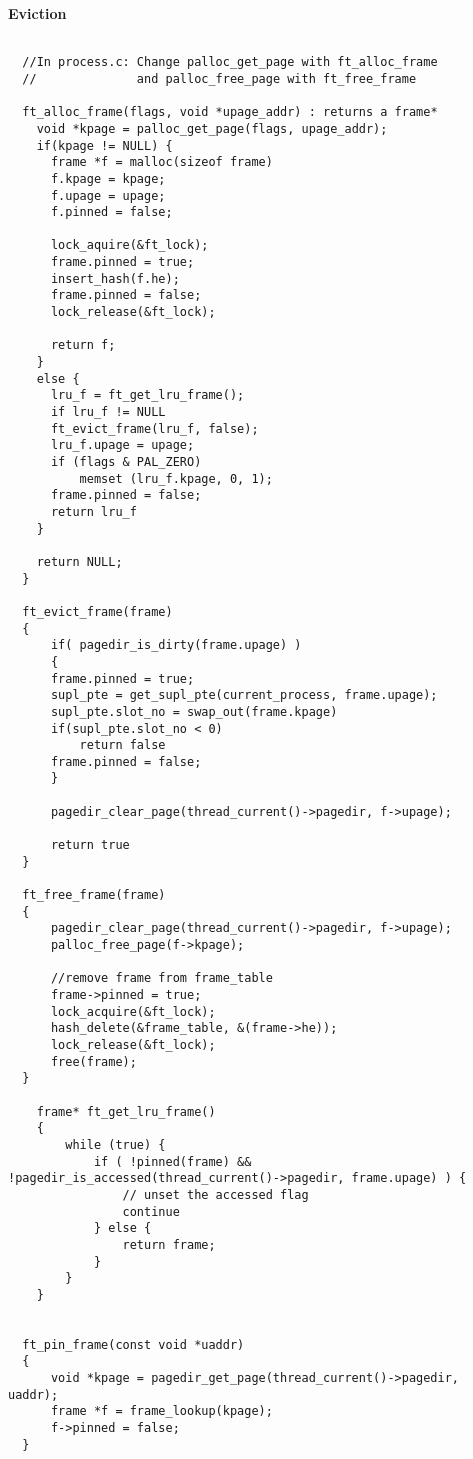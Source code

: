 	
\textbf{Eviction}

\begin{lstlisting}

  //In process.c: Change palloc_get_page with ft_alloc_frame 
  //              and palloc_free_page with ft_free_frame  

  ft_alloc_frame(flags, void *upage_addr) : returns a frame*
    void *kpage = palloc_get_page(flags, upage_addr);
    if(kpage != NULL) {
      frame *f = malloc(sizeof frame)
      f.kpage = kpage;
      f.upage = upage;
      f.pinned = false;
      
      lock_aquire(&ft_lock);
      frame.pinned = true;
      insert_hash(f.he);
      frame.pinned = false;	
      lock_release(&ft_lock);
      
      return f;
    }
    else {
      lru_f = ft_get_lru_frame();
      if lru_f != NULL
	  ft_evict_frame(lru_f, false);
	  lru_f.upage = upage;
	  if (flags & PAL_ZERO)
		  memset (lru_f.kpage, 0, 1);
	  frame.pinned = false;
	  return lru_f
    }

    return NULL;
  }
 
  ft_evict_frame(frame)
  {
      if( pagedir_is_dirty(frame.upage) )
      {
	  frame.pinned = true;
	  supl_pte = get_supl_pte(current_process, frame.upage);
	  supl_pte.slot_no = swap_out(frame.kpage)
	  if(supl_pte.slot_no < 0)
		  return false
	  frame.pinned = false;
      }	
      
      pagedir_clear_page(thread_current()->pagedir, f->upage);
      
      return true
  }

  ft_free_frame(frame)
  {
      pagedir_clear_page(thread_current()->pagedir, f->upage);
      palloc_free_page(f->kpage);
      
      //remove frame from frame_table
      frame->pinned = true;
      lock_acquire(&ft_lock);
      hash_delete(&frame_table, &(frame->he));
      lock_release(&ft_lock);
      free(frame);
  }
	
	frame* ft_get_lru_frame()
	{
    	while (true) {
			if ( !pinned(frame) && !pagedir_is_accessed(thread_current()->pagedir, frame.upage) ) {
				// unset the accessed flag
				continue
			} else {
	    		return frame;
	    	}
	    }
    }
  

  ft_pin_frame(const void *uaddr)
  {
      void *kpage = pagedir_get_page(thread_current()->pagedir, uaddr);
      frame *f = frame_lookup(kpage);
      f->pinned = false;
  }

  
\end{lstlisting}

